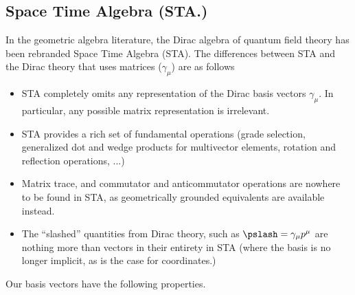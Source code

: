 \subsection{Space Time Algebra (STA.)}
In the geometric algebra literature, the Dirac algebra of quantum field theory has been rebranded Space Time Algebra (STA).
The differences between STA and the Dirac theory that uses matrices (\( \gamma_\mu \)) are as follows
\begin{itemize}
\item STA completely omits any representation of the Dirac basis vectors \( \gamma_\mu \).  In particular, any possible matrix representation is irrelevant.
\item STA provides a rich set of fundamental operations (grade selection, generalized dot and wedge products for multivector elements, rotation and reflection operations, ...)
\item Matrix trace, and commutator and anticommutator operations are nowhere to be found in STA, as geometrically grounded equivalents are available instead.
\item The ``slashed'' quantities from Dirac theory, such as \( \pslash = \gamma_\mu p^\mu \) are nothing more than vectors in their entirety in STA (where the basis is no longer implicit, as is the case for coordinates.)
\end{itemize}
Our basis vectors have the following properties.
